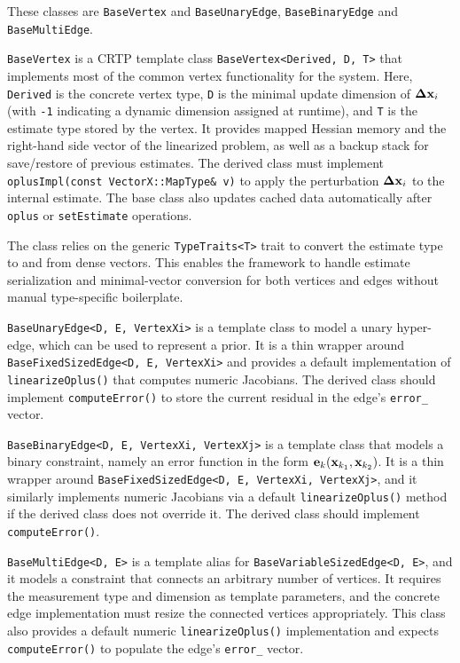 \documentclass[a4paper]{article}
\begin{document}
These classes are \verb+BaseVertex+ and \verb+BaseUnaryEdge+,
\verb+BaseBinaryEdge+ and \verb+BaseMultiEdge+.
\begin{description}
\item \verb+BaseVertex+ is a CRTP template class
  \verb+BaseVertex<Derived, D, T>+ that implements most of the common
  vertex functionality for the system. Here, \verb+Derived+ is the
  concrete vertex type, \verb+D+ is the minimal update dimension of
  $\mathbf{\Delta x}_i$ (with \verb+-1+ indicating a dynamic dimension assigned
  at runtime), and \verb+T+ is the estimate type stored by the vertex.
  It provides mapped Hessian memory and the right-hand side vector of
  the linearized problem, as well as a backup stack for save/restore
  of previous estimates. The derived class must implement
  \verb+oplusImpl(const VectorX::MapType& v)+ to apply the perturbation
  $\mathbf{\Delta x}_i$ to the internal estimate. The base class also updates
  cached data automatically after \verb+oplus+ or \verb+setEstimate+
  operations.

  The class relies on the generic \verb+TypeTraits<T>+ trait to convert
  the estimate type to and from dense vectors. This enables the
  framework to handle estimate serialization and minimal-vector
  conversion for both vertices and edges without manual type-specific
  boilerplate.

\item \verb+BaseUnaryEdge<D, E, VertexXi>+ is a template class to
  model a unary hyper-edge, which can be used to represent a prior.
  It is a thin wrapper around \verb+BaseFixedSizedEdge<D, E, VertexXi>+
  and provides a default implementation of \verb+linearizeOplus()+
  that computes numeric Jacobians. The derived class should implement
  \verb+computeError()+ to store the current residual in the edge's
  \verb+error_+ vector.

\item \verb+BaseBinaryEdge<D, E, VertexXi, VertexXj>+ is a template class
  that models a binary constraint, namely an error function in the form
  $\mathbf{e}_k(\mathbf{x}_{k_1}, \mathbf{x}_{k_2})$. It is a thin wrapper around
  \verb+BaseFixedSizedEdge<D, E, VertexXi, VertexXj>+, and it similarly
  implements numeric Jacobians via a default \verb+linearizeOplus()+
  method if the derived class does not override it. The derived class
  should implement \verb+computeError()+.

\item \verb+BaseMultiEdge<D, E>+ is a template alias for
  \verb+BaseVariableSizedEdge<D, E>+, and it models a constraint that
  connects an arbitrary number of vertices. It requires the measurement
  type and dimension as template parameters, and the concrete edge
  implementation must resize the connected vertices appropriately.
  This class also provides a default numeric \verb+linearizeOplus()+
  implementation and expects \verb+computeError()+ to populate the
  edge's \verb+error_+ vector.
\end{description}
\end{document}
